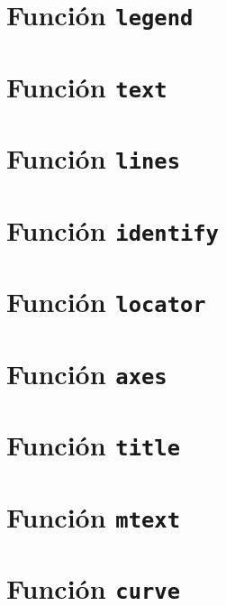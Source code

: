 \documentclass[10pt,]{krantz}
\begin{document}
\section{\texorpdfstring{Función \texttt{legend} 
}{Función legend  }}\label{funcion-legend}

\section{\texorpdfstring{Función \texttt{text} 
}{Función text  }}\label{funcion-text}

\section{\texorpdfstring{Función \texttt{lines} 
}{Función lines  }}\label{funcion-lines}

\section{\texorpdfstring{Función \texttt{identify} 
}{Función identify  }}\label{funcion-identify}

\section{\texorpdfstring{Función \texttt{locator}
}{Función locator }}\label{funcion-locator}

\section{\texorpdfstring{Función \texttt{axes} 
}{Función axes  }}\label{funcion-axes}

\section{\texorpdfstring{Función \texttt{title} 
}{Función title  }}\label{funcion-title}

\section{\texorpdfstring{Función \texttt{mtext}
}{Función mtext }}\label{funcion-mtext}

\section{\texorpdfstring{Función \texttt{curve} 
}{Función curve  }}\label{funcion-curve}
\end{document}

